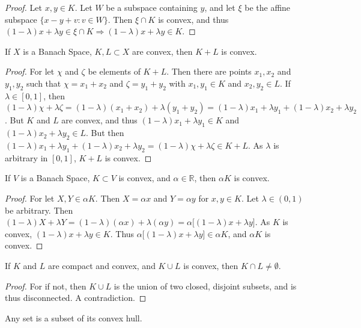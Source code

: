 \documentclass[crop=false,class=article,oneside]{standalone}
\begin{document}
        \begin{proof}
        Let $x,y\in K$. Let $W$ be a subspace containing $y$, and let $\xi$ be the affine subspace $\{x-y+v:v\in W\}$. Then $\xi\cap K$ is convex, and thus $(1-\lambda)x+\lambda y \in \xi \cap K \Rightarrow (1-\lambda)x+\lambda y \in K$.
        \end{proof}
        \begin{theorem}
        If $X$ is a Banach Space, $K,L\subset X$ are convex, then $K+L$ is convex.
        \end{theorem}
        \begin{proof}
        For let $\chi$ and $\zeta$ be elements of $K+L$. Then there are points $x_1,x_2$ and $y_1,y_2$ such that $\chi=x_1+x_2$ and $\zeta = y_1+y_2$ with $x_1,y_1\in K$ and $x_2,y_2\in L$. If $\lambda \in [0,1]$, then $(1-\lambda)\chi + \lambda \zeta = (1-\lambda)(x_1+x_2)+\lambda(y_1+y_2) = (1-\lambda)x_1 + \lambda y_1 + (1-\lambda)x_2 + \lambda y_2$. But $K$ and $L$ are convex, and thus $(1-\lambda)x_1 + \lambda y_1 \in K$ and $(1-\lambda)x_2 + \lambda y_2 \in L$. But then $(1-\lambda)x_1 + \lambda y_1 + (1-\lambda)x_2 + \lambda y_2=(1-\lambda)\chi + \lambda \zeta\in K+L$. As $\lambda$ is arbitrary in $[0,1]$, $K+L$ is convex.
        \end{proof}
        \begin{theorem}
        If $V$ is a Banach Space, $K\subset V$ is convex, and $\alpha \in \mathbb{R}$, then $\alpha K$ is convex.
        \end{theorem}
        \begin{proof}
        For let $X,Y\in \alpha K$. Then $X = \alpha x$ and $Y = \alpha y$ for $x,y\in K$. Let $\lambda \in (0,1)$ be arbitrary. Then $(1-\lambda)X+\lambda Y =(1-\lambda)(\alpha x)+\lambda (\alpha y) = \alpha\big[(1-\lambda)x+\lambda y\big]$. As $K$ is convex, $(1-\lambda)x+\lambda y \in K$. Thus $\alpha\big[(1-\lambda)x+\lambda y\big] \in \alpha K$, and $\alpha K$ is convex.
        \end{proof}
        \begin{theorem}
        If $K$ and $L$ are compact and convex, and $K\cup L$ is convex, then $K\cap L \ne \emptyset$.
        \end{theorem}
        \begin{proof}
        For if not, then $K\cup L$ is the union of two closed, disjoint subsets, and is thus disconnected. A contradiction. 
        \end{proof}
        \begin{lemma}
        Any set is a subset of its convex hull.
        \end{lemma}
\end{document}
